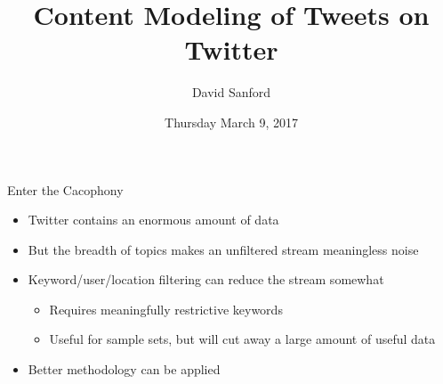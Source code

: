\documentclass[aspectratio=169]{beamer}
\title{Content Modeling of Tweets on Twitter}
\author{David Sanford}
\institute{Data Science Immersive\\ General Assembly}
\date{Thursday March 9, 2017}
\begin{document}
\begin{frame}
  \titlepage
\end{frame}

\begin{frame}{Enter the Cacophony}
  \begin{itemize}
  \item<alert@1> Twitter contains an enormous amount of data
  \item<2-|alert@2> But the breadth of topics makes an unfiltered
    stream meaningless noise
  \end{itemize}

  
  \begin{center}
  \end{center}

   {
    \begin{itemize}
    \item Keyword/user/location filtering can reduce the stream
      somewhat
      \begin{itemize}
      \item Requires meaningfully restrictive keywords
      \item Useful for sample sets, but will cut away a large amount
        of useful data
      \end{itemize}
    \item Better methodology can be applied
    \end{itemize}
  }

  \begin{center}
  \end{center}

  
\end{frame}
\end{document}
